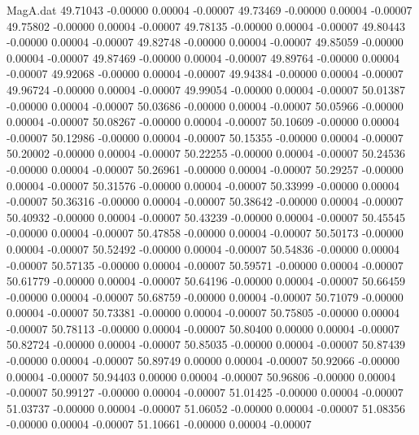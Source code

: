 \begin{filecontents}{MagA.dat}
  49.71043   -0.00000    0.00004   -0.00007
  49.73469   -0.00000    0.00004   -0.00007
  49.75802   -0.00000    0.00004   -0.00007
  49.78135   -0.00000    0.00004   -0.00007
  49.80443   -0.00000    0.00004   -0.00007
  49.82748   -0.00000    0.00004   -0.00007
  49.85059   -0.00000    0.00004   -0.00007
  49.87469   -0.00000    0.00004   -0.00007
  49.89764   -0.00000    0.00004   -0.00007
  49.92068   -0.00000    0.00004   -0.00007
  49.94384   -0.00000    0.00004   -0.00007
  49.96724   -0.00000    0.00004   -0.00007
  49.99054   -0.00000    0.00004   -0.00007
  50.01387   -0.00000    0.00004   -0.00007
  50.03686   -0.00000    0.00004   -0.00007
  50.05966   -0.00000    0.00004   -0.00007
  50.08267   -0.00000    0.00004   -0.00007
  50.10609   -0.00000    0.00004   -0.00007
  50.12986   -0.00000    0.00004   -0.00007
  50.15355   -0.00000    0.00004   -0.00007
  50.20002   -0.00000    0.00004   -0.00007
  50.22255   -0.00000    0.00004   -0.00007
  50.24536   -0.00000    0.00004   -0.00007
  50.26961   -0.00000    0.00004   -0.00007
  50.29257   -0.00000    0.00004   -0.00007
  50.31576   -0.00000    0.00004   -0.00007
  50.33999   -0.00000    0.00004   -0.00007
  50.36316   -0.00000    0.00004   -0.00007
  50.38642   -0.00000    0.00004   -0.00007
  50.40932   -0.00000    0.00004   -0.00007
  50.43239   -0.00000    0.00004   -0.00007
  50.45545   -0.00000    0.00004   -0.00007
  50.47858   -0.00000    0.00004   -0.00007
  50.50173   -0.00000    0.00004   -0.00007
  50.52492   -0.00000    0.00004   -0.00007
  50.54836   -0.00000    0.00004   -0.00007
  50.57135   -0.00000    0.00004   -0.00007
  50.59571   -0.00000    0.00004   -0.00007
  50.61779   -0.00000    0.00004   -0.00007
  50.64196   -0.00000    0.00004   -0.00007
  50.66459   -0.00000    0.00004   -0.00007
  50.68759   -0.00000    0.00004   -0.00007
  50.71079   -0.00000    0.00004   -0.00007
  50.73381   -0.00000    0.00004   -0.00007
  50.75805   -0.00000    0.00004   -0.00007
  50.78113   -0.00000    0.00004   -0.00007
  50.80400    0.00000    0.00004   -0.00007
  50.82724   -0.00000    0.00004   -0.00007
  50.85035   -0.00000    0.00004   -0.00007
  50.87439   -0.00000    0.00004   -0.00007
  50.89749    0.00000    0.00004   -0.00007
  50.92066   -0.00000    0.00004   -0.00007
  50.94403    0.00000    0.00004   -0.00007
  50.96806   -0.00000    0.00004   -0.00007
  50.99127   -0.00000    0.00004   -0.00007
  51.01425   -0.00000    0.00004   -0.00007
  51.03737   -0.00000    0.00004   -0.00007
  51.06052   -0.00000    0.00004   -0.00007
  51.08356   -0.00000    0.00004   -0.00007
  51.10661   -0.00000    0.00004   -0.00007

\end{filecontents}
